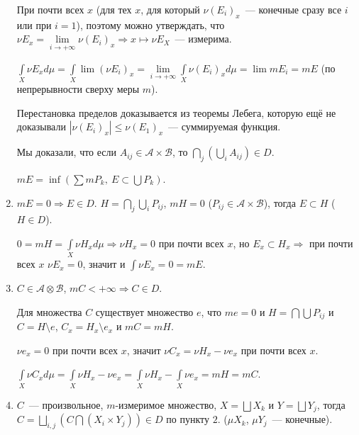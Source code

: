\documentclass{article}
\begin{document}
\begin{enumerate}
                    При почти всех $x$ (для тех $x$, для который $\nu (E_i)_x$~--- конечные сразу все $i$ или при $i = 1$), поэтому можно утверждать, что $\nu E_x = \lim\limits_{i \rightarrow +\infty} \nu (E_i)_x \Rightarrow x\mapsto \nu E_X$~--- измерима.
                    
                    $\int\limits_{X} \nu E_x d \mu = \int\limits_{X} \lim (\nu E_i)_x = \lim\limits_{i \rightarrow +\infty} \int\limits_{X} \nu (E_i)_x d \mu = \lim m E_i = m E$ (по непрерывности сверху меры $m$).
                    
                    Перестановка пределов доказывается из теоремы Лебега, которую ещё не доказывали $|\nu (E_i)_x | \leqslant \nu (E_1)_x$~--- суммируемая функция.
                    
                    Мы доказали, что если $A_{ij} \in \mathcal{A} \times \mathcal{B}$, то $\bigcap\limits_{j} \left( \bigcup\limits_{i} A_{ij} \right) \in D$.
        
                    $m E = \inf \left( \sum m P_k, \ E \subset \bigcup P_k \right)$.
    
                \item $m E = 0 \Rightarrow E \in D$. $H = \bigcap\limits_{j} \bigcup\limits_{i} P_{ij}$, $m H = 0$ ($P_{ij} \in \mathcal{A} \times \mathcal{B}$), тогда $E \subset H$ ($H \in D$).
                
                    $0 = m H = \int\limits_{X} \nu H_x d \mu \Rightarrow \nu H_x = 0$ при почти всех $x$, но $E_x \subset H_x \Rightarrow$ при почти всех $x$ $\nu E_x = 0$, значит и $\int \nu E_x = 0 = m E$.
                    
                \item $C \in \mathcal{A} \otimes \mathcal{B}$, $m C < +\infty \Rightarrow C \in D$.
                
                    Для множества $C$ существует множество $e$, что $m e = 0$ и $H = \bigcap \bigcup P_{ij}$ и $C = H \setminus e$, $C_x = H_x \setminus e_x$ и $m C = m H$.
                    
                    $\nu e_x = 0$ при почти всех $x$, значит $\nu C_x = \nu H_x - \nu e_x$ при почти всех $x$.
                    
                    $\int\limits_{X} \nu C_x d \mu = \int\limits_{X} \nu H_x - \nu e_x = \int\limits_{X} \nu H_x - \int\limits_{X} \nu e_x = mH = m C$.
                    
                \item $C$~--- произвольное, $m$-измеримое множество, $X = \bigsqcup X_k$ и $Y = \bigsqcup Y_j$, тогда $C = \bigsqcup\limits_{i, j} \left( C \bigcap \left( X_i \times Y_j \right) \right) \in D$ по пункту $2$. ($\mu X_k$, $\mu Y_j$~--- конечные).
                
            \end{enumerate}
        
\end{document}
